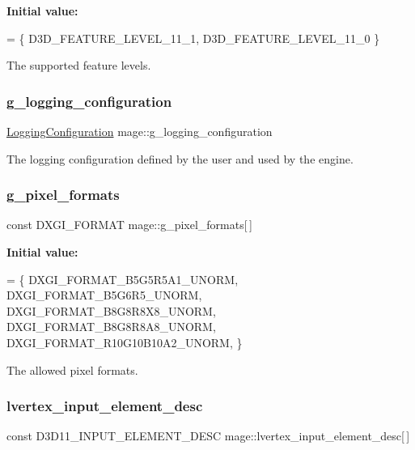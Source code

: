 {\bfseries Initial value\+:}
\begin{DoxyCode}
= \{
        D3D\_FEATURE\_LEVEL\_11\_1,
        D3D\_FEATURE\_LEVEL\_11\_0
    \}
\end{DoxyCode}
The supported feature levels. \hypertarget{namespacemage_a162413669f92d91c7ee135d60f93fcf1}{}\label{namespacemage_a162413669f92d91c7ee135d60f93fcf1} 
\subsubsection{\texorpdfstring{g\+\_\+logging\+\_\+configuration}{g\_logging\_configuration}}
{\footnotesize\ttfamily \hyperlink{structmage_1_1_logging_configuration}{Logging\+Configuration} mage\+::g\+\_\+logging\+\_\+configuration}

The logging configuration defined by the user and used by the engine. \hypertarget{namespacemage_a5a4e11b65061c618b85826ab6df480e0}{}\label{namespacemage_a5a4e11b65061c618b85826ab6df480e0} 
\subsubsection{\texorpdfstring{g\+\_\+pixel\+\_\+formats}{g\_pixel\_formats}}
{\footnotesize\ttfamily const D\+X\+G\+I\+\_\+\+F\+O\+R\+M\+AT mage\+::g\+\_\+pixel\+\_\+formats\mbox{[}$\,$\mbox{]}}

{\bfseries Initial value\+:}
\begin{DoxyCode}
= \{
        DXGI\_FORMAT\_B5G5R5A1\_UNORM,    
        DXGI\_FORMAT\_B5G6R5\_UNORM,      
        DXGI\_FORMAT\_B8G8R8X8\_UNORM,    
        DXGI\_FORMAT\_B8G8R8A8\_UNORM,    
        DXGI\_FORMAT\_R10G10B10A2\_UNORM, 
    \}
\end{DoxyCode}
The allowed pixel formats. \hypertarget{namespacemage_ae6b56f20c8e8917ef1be8d9e4cef3ea3}{}\label{namespacemage_ae6b56f20c8e8917ef1be8d9e4cef3ea3} 
\subsubsection{\texorpdfstring{lvertex\+\_\+input\+\_\+element\+\_\+desc}{lvertex\_input\_element\_desc}}
{\footnotesize\ttfamily const D3\+D11\+\_\+\+I\+N\+P\+U\+T\+\_\+\+E\+L\+E\+M\+E\+N\+T\+\_\+\+D\+E\+SC mage\+::lvertex\+\_\+input\+\_\+element\+\_\+desc\mbox{[}$\,$\mbox{]}}

